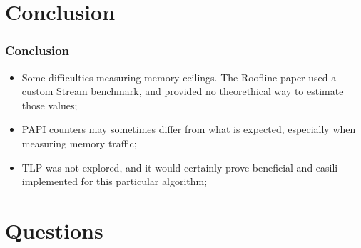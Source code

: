 \documentclass{beamer}
\begin{document}
\section{Conclusion}
\begin{frame}
	\frametitle{Conclusion}
	\begin{itemize}
		\item Some difficulties measuring memory ceilings. The Roofline paper used a custom Stream benchmark, and provided no theorethical way to estimate those values;
		\item PAPI counters may sometimes differ from what is expected, especially when measuring memory traffic;
		\item TLP was not explored, and it would certainly prove beneficial and easili implemented for this particular algorithm;
	\end{itemize}
\end{frame}

\section{Questions}
\begin{frame}
	\titlepage
	
	
\end{frame}
\end{document}
